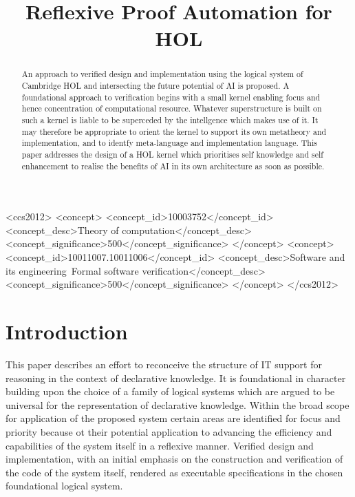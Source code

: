 \documentclass[sigplan,10pt,anonymous,review]{acmart}
\begin{document}
\title{Reflexive Proof Automation for HOL}

\begin{abstract}
An approach to verified design and implementation using
the logical system of Cambridge HOL and intersecting
the future potential of AI is proposed.
A foundational approach to verification begins with
a small kernel enabling focus and hence concentration of
computational resource.
Whatever superstructure is built on such a kernel
is liable to be superceded by the intellgence which
makes use of it.
It may therefore be appropriate to orient the kernel to support
its own metatheory and implementation,
and to identfy meta-language and implementation language.
This paper addresses the design of a HOL kernel
which prioritises self knowledge and self enhancement
to realise the benefits of AI in its own architecture
as soon as possible.
\end{abstract}


\begin{CCSXML}
<ccs2012>
   <concept>
       <concept_id>10003752</concept_id>
       <concept_desc>Theory of computation</concept_desc>
       <concept_significance>500</concept_significance>
       </concept>
   <concept>
       <concept_id>10011007.10011006</concept_id>
       <concept_desc>Software and its engineering~Formal software verification</concept_desc>
       <concept_significance>500</concept_significance>
       </concept>
</ccs2012>
\end{CCSXML}



\section{Introduction}

This paper describes an effort to reconceive the structure of IT support
for reasoning in the context of declarative knowledge.
It is foundational in character building upon the choice of a family of logical systems
which are argued to be universal for the representation of declarative knowledge.
Within the broad scope for application of the proposed system certain areas are
identified for focus and priority because ot their potential application to
advancing the efficiency and capabilities of the system itself in a reflexive manner.
Verified design and implementation, with an initial emphasis on the construction and
verification of the code of the system itself, rendered as executable specifications
in the chosen foundational logical system.
\end{document}
